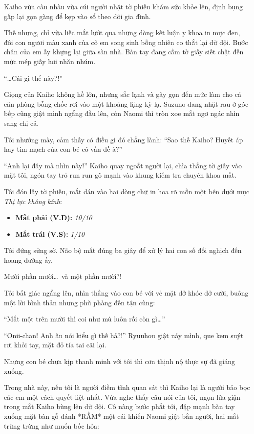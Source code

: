 \documentclass[../main.tex]{subfiles}
\begin{document}
Kaiho vừa càu nhàu vừa cúi người nhặt tờ phiếu khám sức khỏe lên, định bụng gấp lại gọn gàng để kẹp vào sổ theo dõi gia đình.

Thế nhưng, chỉ vừa liếc mắt lướt qua những dòng kết luận y khoa in mực đen, đôi con ngươi màu xanh của cô em song sinh bỗng nhiên co thắt lại dữ dội. Bước chân của em ấy khựng lại giữa sàn nhà. Bàn tay đang cầm tờ giấy siết chặt đến mức mép giấy hơi nhăn nhúm.

``\dots Cái gì thế này?!''

Giọng của Kaiho không hề lớn, nhưng sắc lạnh và gãy gọn đến mức làm cho cả căn phòng bỗng chốc rơi vào một khoảng lặng kỳ lạ. Suzuno đang nhặt rau ở góc bếp cũng giật mình ngẩng đầu lên, còn Naomi thì tròn xoe mắt ngơ ngác nhìn sang chị cả.

Tôi nhướng mày, cảm thấy có điều gì đó chẳng lành: ``Sao thế Kaiho? Huyết áp hay tim mạch của con bé có vấn đề à?''

``Anh lại đây mà nhìn này!'' Kaiho quay ngoắt người lại, chìa thẳng tờ giấy vào mặt tôi, ngón tay trỏ run run gõ mạnh vào khung kiểm tra chuyên khoa mắt.

Tôi đón lấy tờ phiếu, mắt dán vào hai dòng chữ in hoa rõ mồn một bên dưới mục \textit{Thị lực không kính}:

\begin{itemize}
    \item \textbf{Mắt phải (V.D):} \textit{10/10}
    \item \textbf{Mắt trái (V.S):} \textit{1/10}
\end{itemize}

Tôi đứng sững sờ. Não bộ mất đúng ba giây để xử lý hai con số đối nghịch đến hoang đường ấy.

Mười phần mười\dots\ và một phần mười?!

Tôi bất giác ngẩng lên, nhìn thẳng vào con bé với vẻ mặt dở khóc dở cười, buông một lời bình thản nhưng phũ phàng đến tận cùng:

``Mắt một trên mười thì coi như mù luôn rồi còn gì\dots''

``Onii-chan! Anh ăn nói kiểu gì thế hả?!'' Ryuuhou giật nảy mình, que kem suýt rơi khỏi tay, mặt đỏ tía tai cãi lại.

Nhưng con bé chưa kịp thanh minh với tôi thì cơn thịnh nộ thực sự đã giáng xuống.

Trong nhà này, nếu tôi là người điềm tĩnh quan sát thì Kaiho lại là người bảo bọc các em một cách quyết liệt nhất. Vừa nghe thấy câu nói của tôi, ngọn lửa giận trong mắt Kaiho bùng lên dữ dội. Cô nàng bước phắt tới, đập mạnh bàn tay xuống mặt bàn gỗ đánh *RẦM* một cái khiến Naomi giật bắn người, hai mắt trừng trừng như muốn bốc hỏa:
\end{document}
